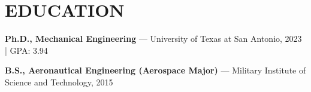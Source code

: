 \documentclass[10pt,letterpaper]{article}
\begin{document}
	
	
	\section*{EDUCATION}
	\textbf{Ph.D., Mechanical Engineering} --- University of Texas at San Antonio, 2023 | GPA: 3.94\par
	\textbf{B.S., Aeronautical Engineering (Aerospace Major)} --- Military Institute of Science and Technology, 2015\par
\end{document}
